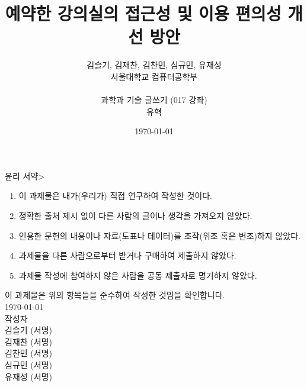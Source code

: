 \documentclass[11pt,a4paper]{article}
\begin{document}
\title{예약한 강의실의 접근성 및 이용 편의성 개선 방안}
\author{
김슬기,
김재찬,
김찬민,
심규민,
유재성 \\
서울대학교 컴퓨터공학부 \\
\\
과학과 기술 글쓰기 (017 강좌)\\
유혁
}
\date{\koreandate\today}
\maketitle

\begin{framed}

\centerline{ 윤리 서약\textgreater}

\begin{enumerate}
\item 이 과제물은 내가(우리가) 직접 연구하여 작성한 것이다.
\item 정확한 출처 제시 없이 다른 사람의 글이나 생각을 가져오지 않았다.
\item 인용한 문헌의 내용이나 자료(도표나 데이터)를 조작(위조 혹은 변조)하지 않았다.
\item 과제물을 다른 사람으로부터 받거나 구매하여 제출하지 않았다.
\item 과제물 작성에 참여하지 않은 사람을 공동 제출자로 명기하지 않았다.
\end{enumerate}

\begin{center}
이 과제물은 위의 항목들을 준수하여 작성한 것임을 확인합니다.\\
\hfill\break
\koreandate\today\\
\hfill\break
작성자\\
\hfill\break
김슬기 (서명)\\
김재찬 (서명)\\
김찬민 (서명)\\
심규민 (서명)\\
유재성 (서명)
\end{center}

\end{framed}
\end{document}
